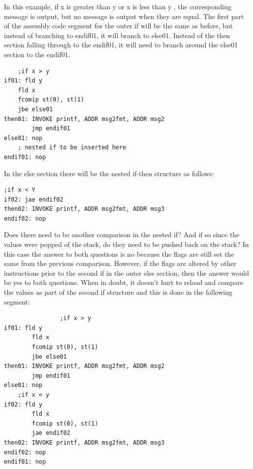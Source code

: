 \documentclass[10pt]{book}
\begin{document}
In this example, if x is greater than y or x is less than y , the corresponding message is output, but no message is output when they are equal. The first part of the assembly code segment for the outer if will be the same as before, but instead of branching to endif01, it will branch to else01. Instead of the then section falling through to the endif01, it will need to branch around the else01 section to the endif01.

\begin{verbatim}
    ;if x > y
if01: fld y
    fld x
    fcomip st(0), st(1)
    jbe else01
then01: INVOKE printf, ADDR msg2fmt, ADDR msg2
        jmp endif01
else01: nop
    ; nested if to be inserted here
endif01: nop
\end{verbatim}

In the else section there will be the nested if-then structure as follows:

\begin{verbatim}
;if x < Y
if02: jae endif02
then02: INVOKE printf, ADDR msg2fmt, ADDR msg3
endif02: nop
\end{verbatim}

Does there need to be another comparison in the nested if? And if so since the values were popped of the stack, do they need to be pushed back on the stack? In this case the answer to both questions is no because the flags are still set the same from the previous comparison. However, if the flags are altered by other instructions prior to the second if in the outer else section, then the answer would be yes to both questions. When in doubt, it doesn't hurt to reload and compare the values as part of the second if structure and this is done in the following segment:

\begin{verbatim}
                ;if x > y
if01: fld y
        fld x
        fcomip st(0), st(1)
        jbe else01
then01: INVOKE printf, ADDR msg2fmt, ADDR msg2
        jmp endif01
else01: nop
    ;if x < y
if02: fld y
        fld x
        fcomip st(0), st(1)
        jae endif02
then02: INVOKE printf, ADDR msg2fmt, ADDR msg3
endif02: nop
endif01: nop
\end{verbatim}
\end{document}
